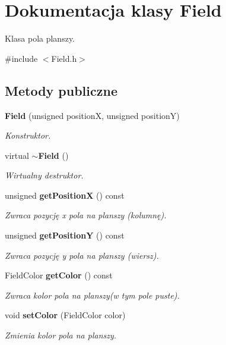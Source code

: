 \section{Dokumentacja klasy Field}
\label{class_field}


Klasa pola planszy.  




{\ttfamily \#include $<$Field.\+h$>$}

\subsection*{Metody publiczne}
\begin{DoxyCompactItemize}
\item 
\textbf{ Field} (unsigned positionX, unsigned positionY)
\begin{DoxyCompactList}\small\item\em Konstruktor. \end{DoxyCompactList}\item 
\mbox{\label{class_field_a45d6e6d09b8f8e46de62b40119d62c60}} 
virtual \textbf{ $\sim$\+Field} ()
\begin{DoxyCompactList}\small\item\em Wirtualny destruktor. \end{DoxyCompactList}\item 
unsigned \textbf{ get\+PositionX} () const
\begin{DoxyCompactList}\small\item\em Zwraca pozycję x pola na planszy (kolumnę). \end{DoxyCompactList}\item 
unsigned \textbf{ get\+PositionY} () const
\begin{DoxyCompactList}\small\item\em Zwraca pozycję y pola na planszy (wiersz). \end{DoxyCompactList}\item 
Field\+Color \textbf{ get\+Color} () const
\begin{DoxyCompactList}\small\item\em Zwraca kolor pola na planszy(w tym pole puste). \end{DoxyCompactList}\item 
void \textbf{ set\+Color} (Field\+Color color)
\begin{DoxyCompactList}\small\item\em Zmienia kolor pola na planszy. \end{DoxyCompactList}\end{DoxyCompactItemize}


